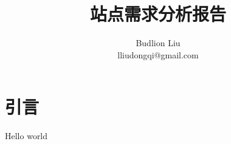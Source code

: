 \documentclass[12pt,a4paper]{article}
\begin{document}
\title{站点需求分析报告}
\author{Budlion Liu\\lliudongqi@gmail.com}
\maketitle
\section{引言}
Hello world
\end{document}
